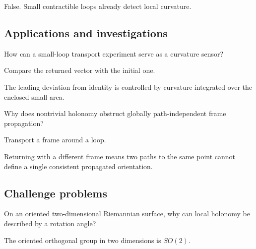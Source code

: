 \begin{solution}
False.  Small contractible loops already detect local curvature.
\end{solution}

\subsection*{Applications and investigations}

\begin{exercise}\label{exr:vii25-ped-13}
How can a small-loop transport experiment serve as a curvature sensor?
\end{exercise}

\begin{hint}
Compare the returned vector with the initial one.
\end{hint}

\begin{solution}
The leading deviation from identity is controlled by curvature integrated over the enclosed small area.
\end{solution}

\begin{exercise}\label{exr:vii25-ped-14}
Why does nontrivial holonomy obstruct globally path-independent frame propagation?
\end{exercise}

\begin{hint}
Transport a frame around a loop.
\end{hint}

\begin{solution}
Returning with a different frame means two paths to the same point cannot define a single consistent propagated orientation.
\end{solution}

\subsection*{Challenge problems}

\begin{exercise}\label{exr:vii25-ped-15}
On an oriented two-dimensional Riemannian surface, why can local holonomy be described by a rotation angle?
\end{exercise}

\begin{hint}
The oriented orthogonal group in two dimensions is \(SO(2)\).
\end{hint}

